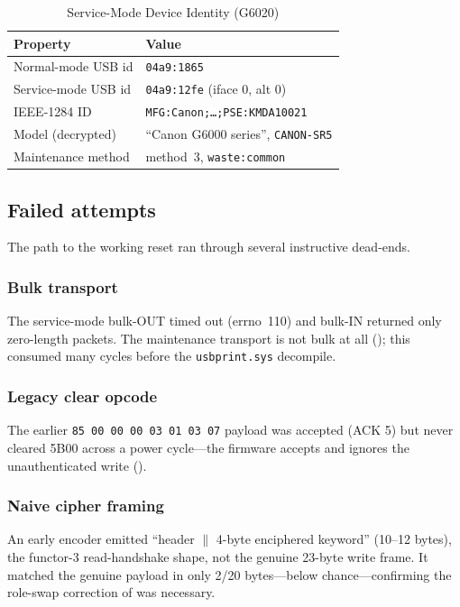 \documentclass[conference]{IEEEtran}
\begin{document}
\begin{table}[ht]
\centering
\caption{Service-Mode Device Identity (G6020)}
\label{tab:device}
\begin{tabular}{@{}ll@{}}
\toprule
Property & Value \\
\midrule
Normal-mode USB id   & \texttt{04a9:1865} \\
Service-mode USB id  & \texttt{04a9:12fe} (iface 0, alt 0) \\
IEEE-1284 ID         & \texttt{MFG:Canon;\ldots;PSE:KMDA10021} \\
Model (decrypted)    & ``Canon G6000 series'', \texttt{CANON-SR5} \\
Maintenance method   & method~3, \texttt{waste:common} \\
\bottomrule
\end{tabular}
\end{table}

\subsection{Failed attempts}
\label{sec:results-failed}

The path to the working reset ran through several instructive dead-ends.

\subsubsection{Bulk transport}
The service-mode bulk-OUT timed out (errno~110) and bulk-IN returned only
zero-length packets. The maintenance transport is not bulk at all
(); this consumed many cycles before the
\texttt{usbprint.sys} decompile.

\subsubsection{Legacy clear opcode}
The earlier \texttt{85\,00\,00\,00\,03\,01\,03\,07} payload was accepted
(ACK 5) but never cleared 5B00 across a power cycle---the firmware accepts
and ignores the unauthenticated write ().

\subsubsection{Naive cipher framing}
An early encoder emitted ``header $\parallel$ 4-byte enciphered keyword''
(10--12 bytes), the functor-3 read-handshake shape, not the genuine
23-byte write frame. It matched the genuine payload in only 2/20 bytes---below
chance---confirming the role-swap correction of  was
necessary.
\end{document}
